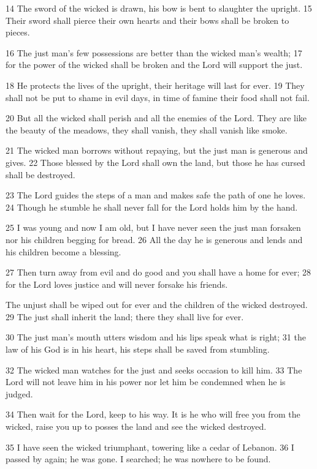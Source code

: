 14 The sword of the wicked is drawn,
his bow is bent to slaughter the upright.
15 Their sword shall pierce their own hearts
and their bows shall be broken to pieces.

16 The just man's few possessions
are better than the wicked man's wealth;
17 for the power of the wicked shall be broken
and the Lord will support the just.

18 He protects the lives of the upright,
their heritage will last for ever.
19 They shall not be put to shame in evil days,
in time of famine their food shall not fail.

20 But all the wicked shall perish
and all the enemies of the Lord.
They are like the beauty of the meadows,
they shall vanish, they shall vanish like smoke.

21 The wicked man borrows without repaying,
but the just man is generous and gives.
22 Those blessed by the Lord shall own the land,
but those he has cursed shall be destroyed.

23 The Lord guides the steps of a man
and makes safe the path of one he loves.
24 Though he stumble he shall never fall
for the Lord holds him by the hand.

25 I was young and now I am old,
but I have never seen the just man forsaken
nor his children begging for bread.
26 All the day he is generous and lends
and his children become a blessing.

27 Then turn away from evil and do good
and you shall have a home for ever;
28 for the Lord loves justice
and will never forsake his friends.

The unjust shall be wiped out for ever
and the children of the wicked destroyed.
29 The just shall inherit the land;
there they shall live for ever.

30 The just man's mouth utters wisdom
and his lips speak what is right;
31 the law of his God is in his heart,
his steps shall be saved from stumbling.

32 The wicked man watches for the just
and seeks occasion to kill him.
33 The Lord will not leave him in his power
nor let him be condemned when he is judged.

34 Then wait for the Lord, keep to his way.
It is he who will free you from the wicked,
raise you up to posses the land
and see the wicked destroyed.

35 I have seen the wicked triumphant,
towering like a cedar of Lebanon.
36 I passed by again; he was gone.
I searched; he was nowhere to be found.

